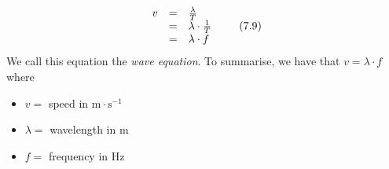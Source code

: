     \begin{equation}
    \begin{array}{ccc}\hfill v& =& \frac{\lambda }{T}\hfill \\ & =& \lambda \ensuremath{\cdot}\frac{1}{T}\hfill \\ & =& \lambda \ensuremath{\cdot}f\hfill \end{array}\tag{7.9}
      \end{equation}
        \label{m38806*id319870}We call this equation the \textsl{wave equation}. To summarise, we have that $v=\lambda \ensuremath{\cdot}f$ where\par 
        \label{m38806*id319901}\begin{itemize}[noitemsep]
            \label{m38806*uid22}\item $v=$ speed in $\mathrm{m}\ensuremath{\cdot}\mathrm{s}{}^{-1}$\label{m38806*uid23}\item $\lambda =$ wavelength in $\mathrm{m}$
\label{m38806*uid24}\item $f=$ frequency in $\mathrm{Hz}$
\end{itemize}
\par
            \label{m38806*secfhsst!!!underscore!!!id705}\vspace{.5cm} 
      \noindent
